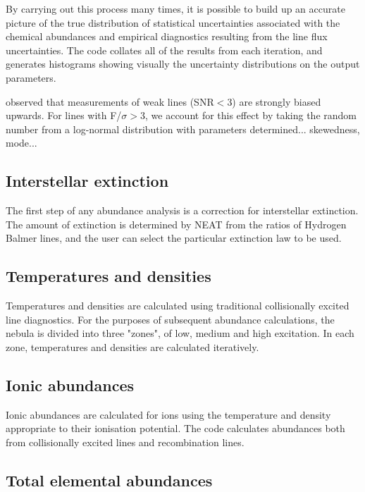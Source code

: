 \documentclass[useAMS,usenatbib]{mn2e}
\begin{document}
By carrying out this process many times, it is possible to build up an accurate picture of the true distribution of statistical uncertainties associated with the chemical abundances and empirical diagnostics resulting from the line flux uncertainties. The code collates all of the results from each iteration, and generates histograms showing visually the uncertainty distributions on the output parameters.

\citet{1994A&A...287..676R} observed that measurements of weak lines (SNR$<$3) are strongly biased upwards.  For lines with F/$\sigma > $3, we account for this effect by taking the random number from a log-normal distribution with parameters determined... skewedness, mode...


\subsection{Interstellar extinction}

The first step of any abundance analysis is a correction for interstellar extinction.  The amount of extinction is determined by NEAT from the ratios of Hydrogen Balmer lines, and the user can select the particular extinction law to be used.

\subsection{Temperatures and densities}

Temperatures and densities are calculated using traditional collisionally excited line diagnostics.  For the purposes of subsequent abundance calculations, the nebula is divided into three "zones", of low, medium and high excitation.  In each zone, temperatures and densities are calculated iteratively.

\subsection{Ionic abundances}

Ionic abundances are calculated for ions using the temperature and density appropriate to their ionisation potential.  The code calculates abundances both from collisionally excited lines and recombination lines.

\subsection{Total elemental abundances}
\end{document}
